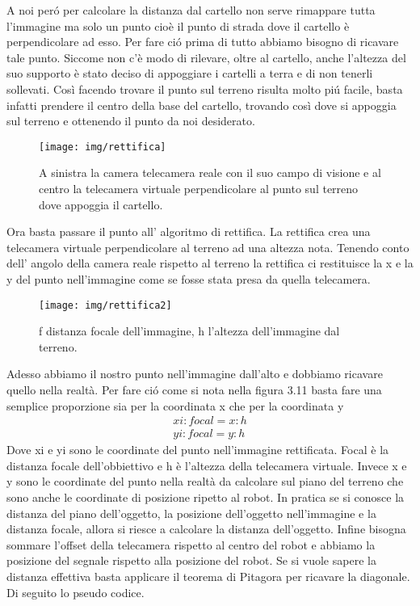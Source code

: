 		A noi per\'o per calcolare la distanza dal cartello non serve rimappare tutta l'immagine ma solo un punto cioè il punto di strada dove il cartello è perpendicolare ad esso. Per fare ci\'o prima di tutto abbiamo bisogno di ricavare tale punto. Siccome non c'è modo di rilevare, oltre al cartello, anche l'altezza del suo supporto è stato deciso di appoggiare i cartelli a terra e di non tenerli sollevati. Così facendo trovare il punto sul terreno risulta molto pi\'u facile, basta infatti prendere il centro della base del cartello, trovando così dove si appoggia sul terreno e ottenendo il punto da noi desiderato.
		\begin{figure}[!ht]
			\centering
			\texttt{[image: img/rettifica]}
			\caption[Telecamera reale e virtuale]{A sinistra la camera telecamera reale con il suo campo di visione e al centro la telecamera virtuale perpendicolare al punto sul terreno dove appoggia il cartello.}
		\end{figure}
		Ora basta passare il punto all' algoritmo di rettifica. La rettifica crea una telecamera virtuale perpendicolare al terreno ad una altezza nota. Tenendo conto dell' angolo della camera reale rispetto al terreno la rettifica ci restituisce la x e la y del punto nell'immagine come se fosse stata presa da quella telecamera.

		\begin{figure}[!ht]
			\centering
			\texttt{[image: img/rettifica2]}
			\caption[Distanza focale e distanza dal terreno]{f distanza focale dell'immagine, h l'altezza dell'immagine dal terreno.}
		\end{figure}
		Adesso abbiamo il nostro punto nell'immagine dall'alto e dobbiamo ricavare quello nella realtà. Per fare ci\'o come si nota nella figura 3.11 basta fare una semplice proporzione sia per la coordinata x che per la coordinata y
		\begin{align*}
			xi : focal = x : h
			\\
			yi : focal = y : h
		\end{align*}
		Dove xi e yi sono le coordinate del punto nell'immagine rettificata. Focal è la distanza focale dell'obbiettivo e h è l'altezza della telecamera virtuale. Invece x e y sono le coordinate del punto nella realtà da calcolare sul piano del terreno che sono anche le coordinate di posizione ripetto al robot. In pratica se si conosce la distanza del piano dell'oggetto, la posizione dell'oggetto nell'immagine e la distanza focale, allora si riesce a calcolare la distanza dell'oggetto. Infine bisogna sommare l'offset della telecamera rispetto al centro del robot e abbiamo la posizione del segnale rispetto alla posizione del robot. Se si vuole sapere la distanza effettiva basta applicare il teorema di Pitagora per ricavare la diagonale. Di seguito lo pseudo codice.

